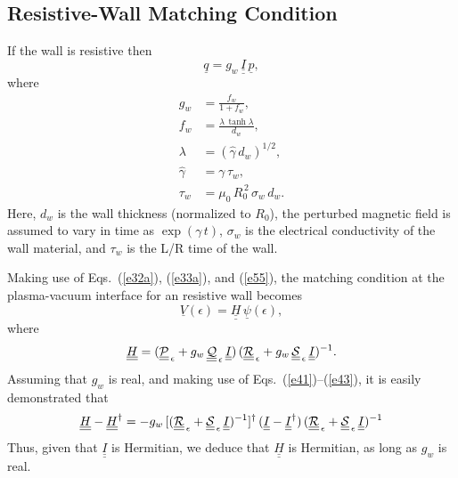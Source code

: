 \documentclass[12pt,prb,aps,notitlepage]{revtex4-1}
\begin{document}
\subsection{Resistive-Wall Matching Condition}
 If the wall is resistive then  
 \begin{equation}\label{e55}
\underline{q} =g_w\,\underline{\underline{I}} \,\underline{p},
\end{equation}
where
\begin{align}
g_w &= \frac{f_w}{1+f_w},\\[0.5ex]
f_w &= \frac{\lambda\,\tanh\lambda}{d_w},\\[0.5ex]
\lambda &= (\hat{\gamma}\,d_w)^{1/2},\\[0.5ex]
\hat{\gamma}&= \gamma\,\tau_w,\\[0.5ex]
\tau_w&= \mu_0\,R_0^{\,2}\,\sigma_w\,d_w.
\end{align}
Here, $d_w$ is the wall thickness (normalized to $R_0$), the perturbed magnetic field is assumed to vary in time as $\exp(\gamma\,t)$, $\sigma_w$
is the electrical conductivity of the wall material, and $\tau_w$ is the L/R time of the wall. 

Making use of Eqs.~(\ref{e32a}), (\ref{e33a}), and (\ref{e55}),  the matching condition at the plasma-vacuum interface  for an resistive wall becomes 
\begin{equation}\label{e61}
 \underline{V}(\epsilon)= \underline{\underline{H}}\,\underline{\psi}(\epsilon),
 \end{equation}
 where 
 \begin{equation}\label{e62}
 \underline{\underline{H}}= (\underline{\underline{\cal P}}_{\,\epsilon}+g_w\,\underline{\underline{\cal Q}}_{\,\epsilon}\,\underline{\underline{I}})\,(\underline{\underline{\cal R}}_{\,\epsilon}+g_w\,\underline{\underline{\cal S}}_{\,\epsilon}\,\underline{\underline{I}})^{-1}.
 \end{equation}
 Assuming that $g_w$ is real, and making use of Eqs.~(\ref{e41})--(\ref{e43}),  it is easily demonstrated that
 \begin{equation}
 \underline{\underline{H}}-\underline{\underline{H}}^\dag =-g_w\, [(\underline{\underline{\cal R}}_{\,\epsilon}+\underline{\underline{\cal S}}_{\,\epsilon}\,\underline{\underline{I}})^{-1}]^{\dag}\,(\underline{\underline{I}} -\underline{\underline{I}}^\dag)\,  (\underline{\underline{\cal R}}_{\,\epsilon}+\underline{\underline{\cal S}}_{\,\epsilon}\,\underline{\underline{I}})^{-1}
\end{equation}
Thus, given that $\underline{\underline{I}}$ is Hermitian, we deduce that $\underline{\underline{H}}$ is Hermitian, as long as $g_w$ is real. 
 
\end{document}
